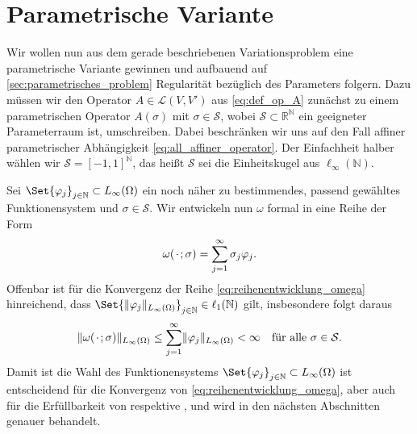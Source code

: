 \section{Parametrische Variante} %
\label{sec:parametrische_variante}

Wir wollen nun aus dem gerade beschriebenen Variationsproblem eine parametrische Variante gewinnen und aufbauend auf \autoref{sec:parametrisches_problem} Regularität bezüglich des Parameters folgern.
Dazu müssen wir den Operator $A \in \mathcal L(V, V')$ aus \eqref{eq:def_op_A} zunächst zu einem parametrischen Operator $A(\sigma)$ mit $\sigma \in \mathcal S$, wobei $\mathcal S \subset \mathbb{R}^{\mathbb{N}}$ ein geeigneter Parameterraum ist, umschreiben.
Dabei beschränken wir uns auf den Fall affiner parametrischer Abhängigkeit \eqref{eq:all_affiner_operator}.
Der Einfachheit halber wählen wir $\mathcal S = [-1, 1]^{\mathbb{N}}$, das heißt $\mathcal S$ sei die Einheitskugel aus $\ell_{\infty}(\mathbb{N})$.

Sei $\Set{ \varphi_{j} }_{j \in \mathbb{N}} \subset L_{\infty}(\Omega)$ ein noch näher zu bestimmendes, passend gewähltes Funktionensystem und $\sigma \in \mathcal S$.
Wir entwickeln nun $\omega$ formal in eine Reihe der Form
\begin{equation}
    \label{eq:reihenentwicklung_omega}
    \omega(\blank; \sigma) = \sum_{j = 1}^{\infty} \sigma_{j} \varphi_{j}.
\end{equation}
Offenbar ist für die Konvergenz der Reihe \eqref{eq:reihenentwicklung_omega} hinreichend, dass $\Set{ \norm{\varphi_{j}}_{L_{\infty}(\Omega)} }_{j \in \mathbb{N}} \in \ell_{1}(\mathbb{N})$ gilt, insbesondere folgt daraus
\begin{equation}
    \norm{\omega(\blank; \sigma)}_{L_{\infty}(\Omega)} \leq \sum_{j = 1}^{\infty} \norm{\varphi_{j}}_{L_{\infty}(\Omega)} < \infty \quad \fa \sigma \in \mathcal S.
\end{equation}
Damit ist die Wahl des Funktionensystems $\Set{ \varphi_{j} }_{j \in \mathbb{N}} \subset L_{\infty}(\Omega)$ ist entscheidend für die Konvergenz von \eqref{eq:reihenentwicklung_omega}, aber auch für die Erfüllbarkeit von  respektive ,
und wird in den nächsten Abschnitten genauer behandelt.


